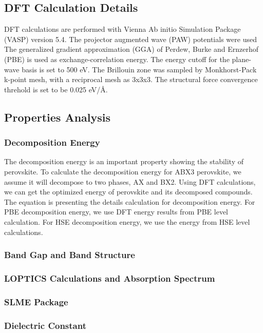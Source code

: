 \documentclass[twoside,twocolumn,9pt]{article}
\begin{document}
    \subsection*{DFT Calculation Details}
    DFT calculations are performed with Vienna Ab initio Simulation
    Package (VASP) version 5.4. The projector augmented wave (PAW)
    potentials were used The generalized gradient approximation (GGA) of
    Perdew, Burke and Ernzerhof (PBE) is used as exchange-correlation
    energy. The energy cutoff for the plane-wave basis is set to 500
    eV. The Brillouin zone was sampled by Monkhorst-Pack k-point mesh,
    with a reciprocal mesh as 3x3x3. The structural force convergence
    threhold is set to be 0.025 eV/Å.

    \subsection*{Properties Analysis}
    \subsubsection*{Decomposition Energy}
    The decomposition energy is an important property showing the
    stability of perovskite. To calculate the decomposition energy for
    ABX3 perovskite, we assume it will decompose to two phases, AX and
    BX2. Using DFT calculations, we can get the optimized energy of
    perovskite and its decomposed compounds.
    The equation is presenting the details calculation for decomposition
    energy. For PBE decomposition energy, we use DFT energy results from
    PBE level calculation. For HSE decomposition energy, we use the energy
    from HSE level calculations.
    \subsubsection*{Band Gap and Band Structure}

    \subsubsection*{LOPTICS Calculations and Absorption Spectrum}

    \subsubsection*{SLME Package}

    \subsubsection*{Dielectric Constant }
\end{document}
